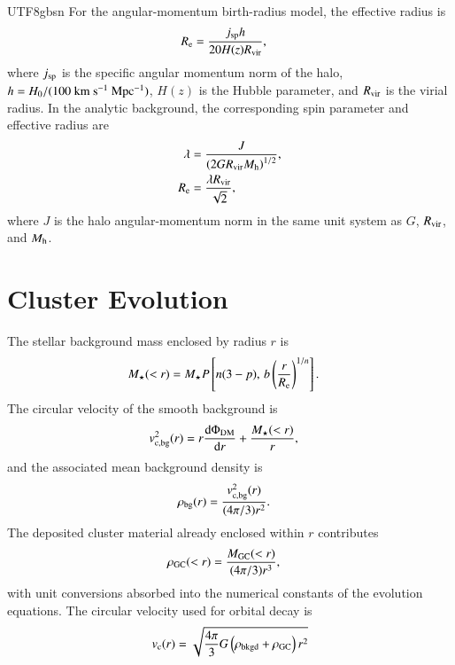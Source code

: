 \documentclass[trackchanges, twocolappendix, twocolumn]{aastex701}
\begin{document}
\begin{CJK*}{UTF8}{gbsn}
For the angular-momentum birth-radius model, the effective radius is
\begin{align}
R_{\rm e} &=
\dfrac{j_{\rm sp}h}{20H(z)R_{\rm vir}},
\end{align}
where $j_{\rm sp}$ is the specific angular momentum norm of the halo, $h=H_0/(100~{\rm km~s^{-1}~Mpc^{-1}})$, $H(z)$ is the Hubble parameter, and $R_{\rm vir}$ is the virial radius. In the analytic background, the corresponding spin parameter and effective radius are
\begin{align}
\lambda &=
\dfrac{J}{\left(2GR_{\rm vir}M_{\rm h}\right)^{1/2}},\\
R_{\rm e} &= \dfrac{\lambda R_{\rm vir}}{\sqrt{2}},
\end{align}
where $J$ is the halo angular-momentum norm in the same unit system as $G$, $R_{\rm vir}$, and $M_{\rm h}$.

\section{Cluster Evolution}
\label{app:evolution_equations}

The stellar background mass enclosed by radius $r$ is
\begin{align}
M_{\star}(<r) &=
M_{\star}
P\left[n(3-p),\,b\left(\dfrac{r}{R_{\rm e}}\right)^{1/n}\right].
\end{align}
The circular velocity of the smooth background is
\begin{align}
v_{\rm c,bg}^2(r) &=
r\dfrac{\mathrm{d}\Phi_{\rm DM}}{\mathrm{d}r}
+\dfrac{M_{\star}(<r)}{r},
\end{align}
and the associated mean background density is
\begin{align}
\rho_{\rm bg}(r) &=
\dfrac{v_{\rm c,bg}^2(r)}{(4\pi/3)r^2}.
\end{align}
The deposited cluster material already enclosed within $r$ contributes
\begin{align}
\rho_{\rm GC}(<r) &=
\dfrac{M_{\rm GC}(<r)}{(4\pi/3)r^3},
\end{align}
with unit conversions absorbed into the numerical constants of the evolution equations. The circular velocity used for orbital decay is
\begin{align}
v_{\rm c} (r) = \sqrt{\dfrac{4 \pi }{3} G \left( \rho_{\rm bkgd} + \rho_{\rm GC} \right) r^2}
\end{align}


\end{CJK*}
\end{document}
